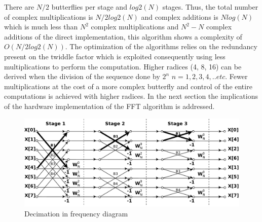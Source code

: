 There are $N/2$ butterflies per stage and $log2(N)$ stages. Thus,  the total number of complex multiplications is $N/2log2(N)$ and complex additions is $Nlog(N)$ which is much less than $N^2$ complex multiplications and $N^2-N$ complex additions of the direct implementation, this algorithm shows a complexity of $O(N/2log2(N))$. The optimization of the algorithms relies on the redundancy present on the twiddle factor which is exploited consequently using less multiplications to perform the computation. Higher radices (4, 8, 16) can be derived when the division of the sequence done by $2^n$ $n = 1, 2, 3, 4, .. etc$. Fewer multiplications at the cost of a more complex butterfly and control of the entire computations is achieved with higher radices.  In the next section the implications of the hardware implementation of the FFT algorithm is addressed. 

\begin{figure}[htbp]
  \centering
   \includegraphics[width=1\textwidth]{./figures/DIF_FFT.pdf}
  \caption{Decimation in frequency diagram}
  \label{fig:dif_diagram}
\end{figure}

